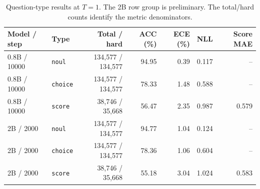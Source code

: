 \begin{table}[t]
\centering
\small
\setlength{\tabcolsep}{4pt}
\caption{Question-type results at $T=1$. The 2B row group is preliminary. The total/hard counts identify the metric denominators.}
\label{tab:types}
\begin{tabular}{llrrrrr}
\toprule
Model / step & Type & Total / hard & ACC (\%) & ECE (\%) & NLL & Score MAE \\
\midrule
0.8B / 10000 & \texttt{noul} & 134,577 / 134,577 & 94.95 & 0.39 & 0.117 & -- \\
0.8B / 10000 & \texttt{choice} & 134,577 / 134,577 & 78.33 & 1.48 & 0.588 & -- \\
0.8B / 10000 & \texttt{score} & 38,746 / 35,668 & 56.47 & 2.35 & 0.987 & 0.579 \\
2B / 2000 & \texttt{noul} & 134,577 / 134,577 & 94.77 & 1.04 & 0.124 & -- \\
2B / 2000 & \texttt{choice} & 134,577 / 134,577 & 78.36 & 1.06 & 0.604 & -- \\
2B / 2000 & \texttt{score} & 38,746 / 35,668 & 55.18 & 3.04 & 1.024 & 0.583 \\
\bottomrule
\end{tabular}
\end{table}
